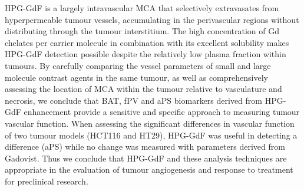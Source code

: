 HPG-GdF is a largely intravascular MCA that selectively extravasates from hyperpermeable tumour vessels, accumulating in the perivascular regions without distributing through the tumour interstitium.
The high concentration of Gd chelates per carrier molecule in combination with its excellent solubility makes \acs{HPG-GdF} detection possible despite the relatively low plasma fraction within tumours.
By carefully comparing the vessel parameters of small and large molecule contrast agents in the same tumour, as well as comprehensively assessing the location of MCA within the tumour relative to vasculature and necrosis, we conclude that \acs{BAT}, \acs{fPV} and \acs{aPS} biomarkers derived from \acs{HPG-GdF} enhancement provide a sensitive and specific approach to measuring tumour vascular function.
When assessing the significant differences in vascular function of two tumour models (HCT116 and HT29), \acs{HPG-GdF} was useful in detecting a difference (\acs{aPS}) while no change was measured with parameters derived from Gadovist.
Thus we conclude that \acs{HPG-GdF} and these analysis techniques are appropriate in the evaluation of tumour angiogenesis and response to treatment for preclinical research.

\endinput
